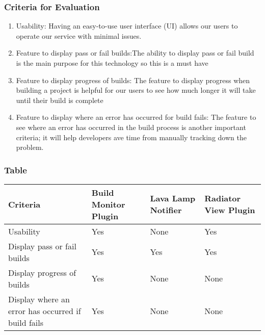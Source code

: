 \documentclass[10pt,letterpaper,onecolumn,draftclsnofoot]{IEEEtran}
\begin{document}
\subsubsection{Criteria for Evaluation}
\begin{enumerate}
  \item Usability: Having an easy-to-use user interface (UI) allows our users to operate our service with minimal issues.
  \item Feature to display pass or fail builds:The ability to display pass or fail build is  the main purpose for this technology so this is a must have
  \item Feature to display progress of builds: The feature to display progress when building a project is helpful for our users to see how much longer it will take until their build is complete
  \item Feature to display where an error has occurred for build fails: The feature to see where an error has occurred in the build process is another important criteria; it will help developers ave time from manually tracking down the problem.
\end{enumerate}
\subsubsection{Table}
\begin{center}
  \begin{tabular}{llll}
    Criteria & Build Monitor Plugin & Lava Lamp Notifier & Radiator View Plugin \\ \midrule
    Usability       & Yes & None & Yes \\ \midrule
    Display pass or fail builds           & Yes & Yes & Yes \\ \midrule
    Display progress of builds       & Yes & None & None \\ \midrule
    Display where an error has occurred if build fails  & Yes & None & None \\ \bottomrule
  \end{tabular}
\end{center}
\end{document}
